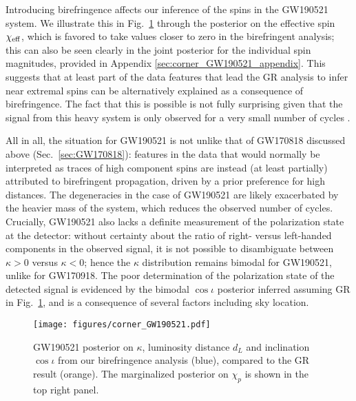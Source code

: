 \documentclass[aps,prd,twocolumn,superscriptaddress,preprintnumbers,floatfix,nofootinbib]{revtex4-2}
\begin{document}
Introducing birefringence affects our inference of the spins in the GW190521 system.
We illustrate this in Fig.~\ref{fig:corner_GW190521} through the posterior on the effective spin $\chi_{\rm eff}$, which is favored to take values closer to zero in the birefringent analysis;
this can also be seen clearly in the joint posterior for the individual spin magnitudes, provided in Appendix \ref{sec:corner_GW190521_appendix}.
This suggests that at least part of the data features that lead the \ac{GR} analysis to infer near extremal spins can be alternatively explained as a consequence of birefringence.
The fact that this is possible is not fully surprising given that the signal from this heavy system is only observed for a very small number of cycles \cite{LIGOScientific:2020iuh,LIGOScientific:2020ufj}.

All in all, the situation for GW190521 is not unlike that of GW170818 discussed above (Sec.~\ref{sec:GW170818}): features in the data that would normally be interpreted as traces of high component spins are instead (at least partially) attributed to birefringent propagation, driven by a prior preference for high distances.
The degeneracies in the case of GW190521 are likely exacerbated by the heavier mass of the system, which reduces the observed number of cycles.
Crucially, GW190521 also lacks a definite measurement of the polarization state at the detector: without certainty about the ratio of right- versus left-handed components in the observed signal, it is not possible to disambiguate between $\kappa > 0$ versus $\kappa < 0$; hence the $\kappa$ distribution remains bimodal for GW190521, unlike for GW170918.
The poor determination of the polarization state of the detected signal is evidenced by the bimodal $\cos\iota$ posterior inferred assuming \ac{GR} in Fig.~\ref{fig:corner_GW190521}, and is a consequence of several factors including sky location.

\begin{figure}
    \texttt{[image: figures/corner\_GW190521.pdf]}
    \caption{
        GW190521 posterior on $\kappa$, luminosity distance $d_L$ and inclination $\cos\iota$ from our birefringence analysis (blue), compared to the GR result (orange).
        The marginalized posterior on $\chi_p$ is shown in the top right panel.
    }
    \label{fig:corner_GW190521}
\end{figure}
\end{document}
